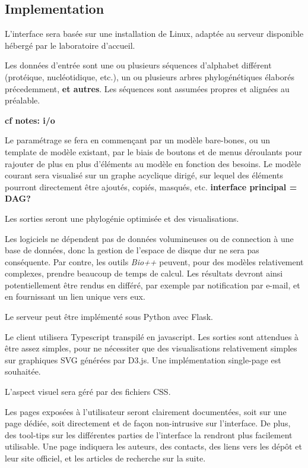 \subsection{Implementation}

L'interface sera basée sur une installation de Linux,
adaptée au serveur disponible hébergé par le laboratoire d'accueil.

Les données d'entrée sont une ou plusieurs séquences d'alphabet différent
(protéique, nucléotidique, etc.),
un ou plusieurs arbres phylogénétiques élaborés précedemment,
\textbf{et autres}.
Les séquences sont assumées propres et alignées au préalable.

\textbf{cf notes: i/o}

Le paramétrage se fera en commençant par un modèle bare-bones,
ou un template de modèle existant,
par le biais de boutons et de menus déroulants
pour rajouter de plus en plus d'éléments au modèle
en fonction des besoins.
Le modèle courant sera visualisé sur un graphe acyclique dirigé,
sur lequel des éléments pourront directement être ajoutés,
copiés, masqués, etc.
\textbf{interface principal = DAG?}

Les sorties seront une phylogénie optimisée
et des visualisations.

Les logiciels ne dépendent pas de données volumineuses
ou de connection à une base de données,
donc la gestion de l'espace de disque dur ne sera pas conséquente.
Par contre, les outils \textit{Bio++} peuvent,
pour des modèles relativement complexes,
prendre beaucoup de temps de calcul.
Les résultats devront ainsi potentiellement
être rendus en différé,
par exemple par notification par e-mail,
et en fournissant un lien unique vers eux.

Le serveur peut être implémenté sous Python avec Flask.

Le client utilisera Typescript transpilé en javascript.
Les sorties sont attendues à être assez simples,
pour ne nécessiter que des visualisations relativement simples
sur graphiques SVG générées par D3.js.
Une implémentation single-page est souhaitée.

L'aspect visuel sera géré par des fichiers CSS.

Les pages exposées à l'utilisateur seront clairement documentées,
soit sur une page dédiée,
soit directement et de façon non-intrusive sur l'interface.
De plus, des tool-tips sur les différentes parties de l'interface
la rendront plus facilement utilisable.
Une page indiquera les auteurs, des contacts,
des liens vers les dépôt et leur site officiel,
et les articles de recherche sur la suite.

